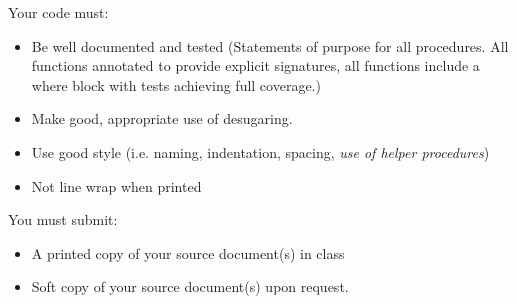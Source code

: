 \documentclass[10pt]{article}
\begin{document}
Your code must:
\begin{itemize}
\item Be well documented and tested (Statements of purpose for all procedures. All functions annotated to provide explicit signatures, all functions include a where block with tests achieving full coverage.)
\item Make good, appropriate use of desugaring. 
\item Use good style (i.e. naming, indentation, spacing, \textit{use of helper procedures})
\item Not line wrap when printed
\end{itemize}

You must submit:
\begin{itemize}
\item A printed copy of your source document(s) in class
\item Soft copy of your source document(s) upon request.
\end{itemize}
\end{document}
